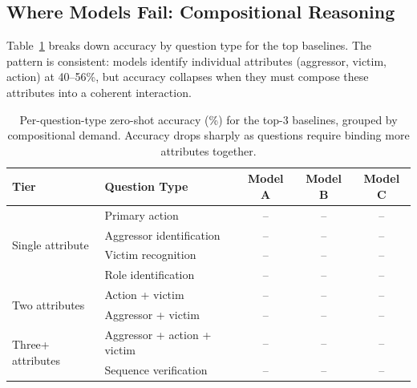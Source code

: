 
\subsection{Where Models Fail: Compositional Reasoning}

Table~\ref{tab:per_type_primary} breaks down accuracy by question type
for the top baselines. The pattern is consistent: models identify
individual attributes (aggressor, victim, action) at 40--56\%, but
accuracy collapses when they must compose these attributes into a
coherent interaction.

\begin{table}[t]
\centering
\caption{Per-question-type zero-shot accuracy (\%) for the top-3 baselines,
grouped by compositional demand. Accuracy drops sharply as questions
require binding more attributes together.}
\label{tab:per_type_primary}
\small
\setlength{\tabcolsep}{4pt}
\begin{tabular}{llccc}
\toprule
Tier & Question Type & Model A & Model B & Model C \\
\midrule
\multirow{4}{*}{Single attribute}
  & Primary action          & -- & -- & -- \\
  & Aggressor identification & -- & -- & -- \\
  & Victim recognition       & -- & -- & -- \\
  & Role identification      & -- & -- & -- \\
\midrule
\multirow{2}{*}{Two attributes}
  & Action + victim          & -- & -- & -- \\
  & Aggressor + victim       & -- & -- & -- \\
\midrule
\multirow{2}{*}{Three+ attributes}
  & Aggressor + action + victim & -- & -- & -- \\
  & Sequence verification       & -- & -- & -- \\
\bottomrule
\end{tabular}
\end{table}

